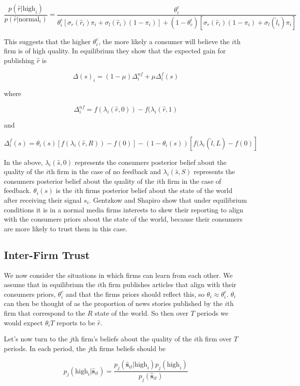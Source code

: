 \documentclass[a4paper]{article}
\begin{document}
\[\frac{p(\hat{r}|\text{high}_i)}{p(\hat{r}|\text{normal}_i)}=\frac{\theta_i^c}{\theta_i^c[\sigma_r(\hat{r}_i) \pi_i + \sigma_l(\hat{r}_i)(1-\pi_i)] + (1 - \theta_c^i)[\sigma_r(\hat{r}_i)(1-\pi_i) + \sigma_l(\hat{l}_i)\pi_i]}\]

This suggests that the higher $\theta_i^c$, the more likely  a consumer will believe the $i$th firm is of high quality.  In equilibrium they show that the expected gain for publishing $\hat{r}$ is

\[\Delta(s)_i = (1 - \mu)\Delta^{nf}_i+\mu \Delta^f_i(s)\]

where

\[\Delta^{nf}_i =f(\lambda_i(\hat{r}, 0)) - f(\lambda_i(\hat{r}, 1)\]

and

\[\Delta^f_i(s) = \theta_i(s)[f(\lambda_i(\hat{r}, R)) - f(0)] - (1-\theta_i(s))[f(\lambda_i(\hat{l},L) - f(0)]\]

In the above, $\lambda_i(\hat{s},0)$ represents the consumers posterior belief about the quality of the $i$th firm in the case of no feedback and $\lambda_i(\hat{s},S)$ represents the consumers posterior belief about the quality of the $i$th firm in the case of feedback.  $\theta_i(s)$ is the $i$th firms posterior belief about the state of the world after receiving their signal $s_i$. Gentzkow and Shapiro show that under equilibrium conditions it is in a normal media firms interests to skew their reporting to align with the consumers priors about the state of the world, because their consumers are more likely to trust them in this case.
\subsection{Inter-Firm Trust}
  
We now consider the situations in which firms can learn from each other.  We assume that in equilibrium the $i$th firm publishes articles that align with their consumers priors, $\theta_i^c$ and that the firms priors should reflect this, so $\theta_i \approx \theta_i^c$.  $\theta_i$ can then be thought of as the proportion of news stories published by the $i$th firm that correspond to the $R$ state of the world.  So then over $T$ periods we would expect $\theta_iT$ reports to be $\hat{r}$.  

Let's now turn to the $j$th firm's beliefs about the quality of the $i$th firm over $T$ periods.  In each period, the $j$th firms beliefs should be
 
 \[p_j(\text{high}_i|\hat{\textbf{s}}_{it}) = \frac{p_j(\hat{\textbf{s}}_{it}|\text{high}_i)p_j(\text{high}_i)}{p_j(\hat{\textbf{s}}_{it})}\]
\end{document}
